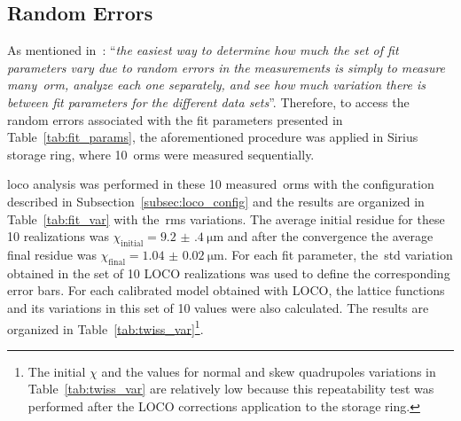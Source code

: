 \subsection{Random Errors}\label{subsec:fit_var}
As mentioned in~\cite{safranek1997}: ``\textit{the easiest way to determine how much the set of fit parameters vary due to random errors in the measurements is simply to measure many~\gls{orm}, analyze each one separately, and see how much variation there is between fit parameters for the different data sets}''. Therefore, to access the random errors associated with the fit parameters presented in Table~\ref{tab:fit_params}, the aforementioned procedure was applied in Sirius storage ring, where 10~\glspl{orm} were measured sequentially. 

\gls{loco} analysis was performed in these 10 measured~\glspl{orm} with the configuration described in Subsection~\ref{subsec:loco_config} and the results are organized in Table~\ref{tab:fit_var} with the~\gls{rms} variations. The average initial residue for these 10 realizations was $\chi_{\mathrm{initial}} = \SI{9.2(4)}{\micro\meter}$ and after the convergence the average final residue was $\chi_{\mathrm{final}} = \SI{1.04(2)}{\micro\meter}$. For each fit parameter, the~\gls{std} variation obtained in the set of 10 LOCO realizations was used to define the corresponding error bars. For each calibrated model obtained with LOCO, the lattice functions and its variations in this set of 10 values were also calculated. The results are organized in Table~\ref{tab:twiss_var}\footnote{The initial $\chi$ and the values for normal and skew quadrupoles variations in Table~\ref{tab:twiss_var} are relatively low because this repeatability test was performed after the LOCO corrections application to the storage ring.}. 

